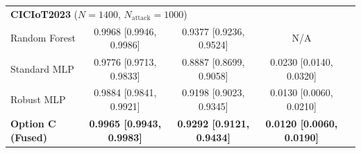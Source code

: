 \begin{table}[htbp]
\begin{tabular}{lcccc}
\midrule
\multicolumn{4}{l}{\textbf{CICIoT2023} ($N=1400$, $N_{\text{attack}}=1000$)} \\
\quad Random Forest & 0.9968 [0.9946, 0.9986] & 0.9377 [0.9236, 0.9524] & N/A \\
\quad Standard MLP & 0.9776 [0.9713, 0.9833] & 0.8887 [0.8699, 0.9058] & 0.0230 [0.0140, 0.0320] \\
\quad Robust MLP & 0.9884 [0.9841, 0.9921] & 0.9198 [0.9023, 0.9345] & 0.0130 [0.0060, 0.0210] \\
\quad \textbf{Option C (Fused)} & \textbf{0.9965 [0.9943, 0.9983]} & \textbf{0.9292 [0.9121, 0.9434]} & \textbf{0.0120 [0.0060, 0.0190]} \\
\midrule
\bottomrule
\end{tabular}
\end{table}